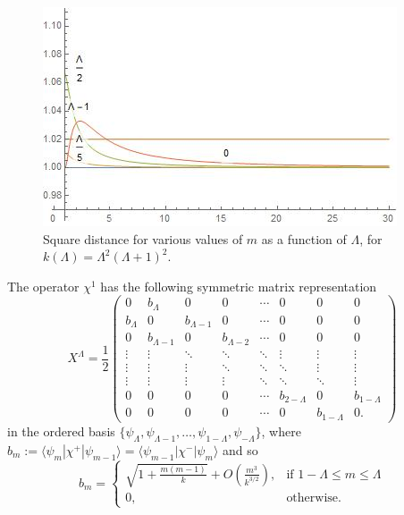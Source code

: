 \begin{figure}
    \centering
    \includegraphics[width = \textwidth]{images/R^2.jpg}
    \caption{Square distance for various values of $m$ as a function of $\Lambda$, for $k(\Lambda) = \Lambda^2(\Lambda+1)^2$.}
    \label{fig:R2Chi}
\end{figure}

The operator $\chi^1$ has the following symmetric matrix representation
\begin{equation}
    X^\Lambda = \frac{1}{2} 
    \begin{pmatrix} 
    0 & b_\Lambda & 0 & 0& \cdots & 0& 0 & 0 \\
    b_\Lambda & 0 & b_{\Lambda - 1} & 0 & \cdots & 0 & 0 & 0\\
    0 & b_{\Lambda-1} & 0 & b_{\Lambda - 2} & \cdots & 0 & 0 &0\\
    \vdots & \vdots & \ddots & \ddots & \ddots & \vdots & \vdots & \vdots\\
    \vdots & \vdots & \vdots & \ddots & \ddots & \ddots & \vdots & \vdots\\
    \vdots & \vdots & \vdots & \vdots & \ddots & \ddots & \ddots & \vdots\\
    0 & 0 & 0 & 0 & \cdots & b_{2-\Lambda} & 0 & b_{1-\Lambda}\\
    0 & 0 & 0 &0 & \cdots & 0 & b_{1-\Lambda} & 0.
    \end{pmatrix}                                                                                                                           
\end{equation}
in the ordered basis $\{\psi_\Lambda, \psi_{\Lambda - 1}, \dots, \psi_{1-\Lambda}, \psi_{-\Lambda}\}$, where $b_m := \langle \psi_m | \chi^+ | \psi_{m-1} \rangle = \langle \psi_{m-1} | \chi ^- | \psi_m\rangle$ and so
\begin{equation}\label{equationbmD2}
    b_m = \begin{cases}
        \sqrt{1 + \frac{m(m-1)}{k}} + O\left( \frac{m^3}{k^{3/2}} \right), & \text{if } 1- \Lambda \leq m \leq \Lambda \\
        0, & \text{otherwise}.
    \end{cases}
\end{equation}

